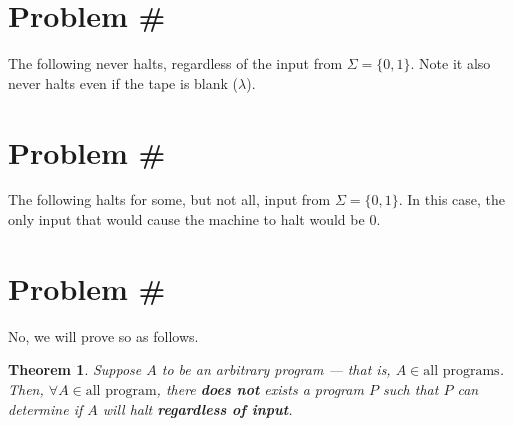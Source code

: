 \documentclass[12pt]{article}
\newcommand{\problem}{
    \addtocounter{section}{1}
    \section*{Problem \#\thesection}
}
\newtheorem{theorem}{Theorem}
\begin{document}
\problem
The following never halts, regardless of the input from $\Sigma = \{ 0, 1 \}$. Note it also never halts even if the tape is blank ($\lambda$).

\begin{center}
\end{center}

\problem
The following halts for some, but not all, input from $\Sigma = \{ 0, 1 \}$. In this case, the only input that would cause the machine to halt would be $0$.
\begin{center}
\end{center}

\problem
No, we will prove so as follows.

\begin{theorem}
Suppose $A$ to be an arbitrary program --- that is, $A \in \text{all programs}$. Then, $\forall A \in \text{all program}$, there \textbf{does not} exists a program $P$ such that $P$ can determine if $A$ will halt \textbf{regardless of input}.
\end{theorem}
\end{document}

